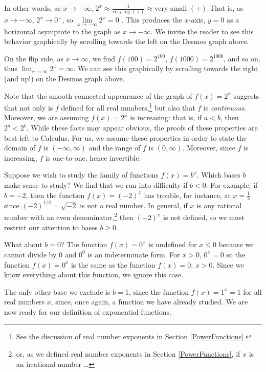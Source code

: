 \documentclass{ximera}
\begin{document}
In other words, as $x \rightarrow -\infty$, $2^{x} \approx \frac{1}{\text{very big $(+)$}}  \approx \text{very small $(+)$}$   That is, as $x \rightarrow -\infty$, $2^{x} \rightarrow 0^{+}$, so $\lim\limits_{x \rightarrow -\infty} 2^{x} =0$ .  This produces the $x$-axis, $y = 0$ as a horizontal asymptote to the graph as $x \rightarrow -\infty$.  We invite the reader to see this behavior graphically by scrolling towards the left on the Desmos graph above.

On the flip side, as $x \rightarrow \infty$, we find $f(100) = 2^{100}$, $f(1000) = 2^{1000}$, and so on, thus $\lim_{x \rightarrow \infty} 2^{x} = \infty$.  We can see this graphically by scrolling towards the right (and up!) on the Desmos graph above.  

Note that the smooth connected appearance of the graph of $f(x) = 2^{x}$ suggests that not only is $f$ defined for all real numbers,\footnote{See the discussion of real number exponents in  Section \ref{PowerFunctions}.}  but  also that $f$ is \textit{continuous}.   Moreover, we are assuming $f(x) = 2^{x}$ is increasing:  that is, if $a<b$, then $2^{a} < 2^{b}$. While these facts may appear obvious, the proofs of these properties are best left to Calculus. For us, we assume these properties in order to state the domain of $f$ is $(-\infty, \infty)$ and the range of $f$ is $(0, \infty)$. Moreover,  since $f$ is increasing, $f$ is one-to-one, hence invertible.
 
    
Suppose we wish to study the family of functions $f(x) = b^{x}$.  Which bases $b$ make sense to study?  We find that we run into difficulty if $b < 0$.  For example, if $b = -2$, then the function $f(x) = (-2)^{x}$ has trouble, for instance, at $x = \frac{1}{2}$ since $(-2)^{1/2} = \sqrt{-2}$ is not a real number. In general, if $x$ is any rational number with an even denominator,\footnote{or, as we defined real number exponents in Section \ref{PowerFunctions}, if $x$ is an irrational  number \ldots} then $(-2)^{x}$ is not defined, so we must restrict our attention to bases $b \geq 0$.  


What about $b = 0$?  The function $f(x) = 0^{x}$ is undefined for $x \leq 0$ because we cannot divide by $0$ and $0^{0}$ is an indeterminate form.  For $x > 0$, $0^{x} = 0$ so the function  $f(x) = 0^{x}$ is the same as the function $f(x) = 0$, $x > 0$. \label{indeterminantformtwo}  Since we know everything about this function, we ignore this case.
 

The only other base we exclude is $b=1$, since the function $f(x) = 1^{x} = 1$ for all real numbers $x$, since, once again, a function we have already studied.  We are now ready for our definition of exponential functions.
\end{document}
